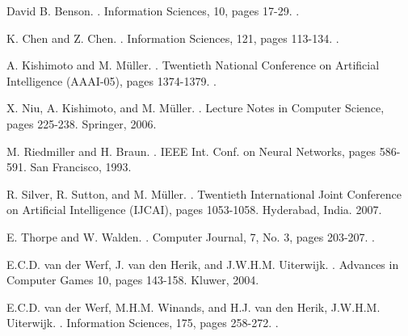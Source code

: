 \documentclass[11pt,letterpaper]{article}
\begin{document}
\begin{thebibliography}{}

David B. Benson.
.
\newblock Information Sciences, 10, pages 17-29.
.

K. Chen and Z. Chen.
.
\newblock Information Sciences, 121, pages 113-134.
.

A. Kishimoto and M. M\"uller.
.
\newblock Twentieth National Conference on Artificial Intelligence (AAAI-05), pages 1374-1379.
.

X. Niu, A. Kishimoto, and M. M\"uller.
.
\newblock Lecture Notes in Computer Science, pages 225-238.
\newblock Springer, 2006.

M. Riedmiller and H. Braun.
.
\newblock IEEE Int. Conf. on Neural Networks, pages 586-591.
\newblock San Francisco, 1993.

R. Silver, R. Sutton, and M. M\"uller.
.
\newblock Twentieth International Joint Conference on Artificial Intelligence (IJCAI), pages 1053-1058.
\newblock Hyderabad, India. 2007.

E. Thorpe and W. Walden.
.
\newblock Computer Journal, 7, No. 3, pages 203-207.
.

E.C.D. van der Werf, J. van den Herik, and J.W.H.M. Uiterwijk.
.
\newblock Advances in Computer Games 10, pages 143-158.
\newblock Kluwer, 2004.

E.C.D. van der Werf, M.H.M. Winands, and H.J. van den Herik, J.W.H.M. Uiterwijk.
.
\newblock Information Sciences, 175, pages 258-272.
.

\end{thebibliography}
\end{document}
